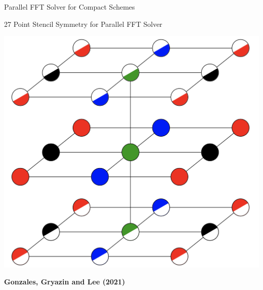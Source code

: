 \documentclass[handout]{beamer}
\begin{document}
\begin{frame}{Parallel FFT Solver for Compact Schemes}
%


\end{frame}







\begin{frame}{27 Point Stencil Symmetry for Parallel FFT Solver}
\begin{center}
\includegraphics[scale=.2]{images/color_stencil}
\end{center}
\textbf{Gonzales, Gryazin and Lee (2021)}
\end{frame}
\end{document}
